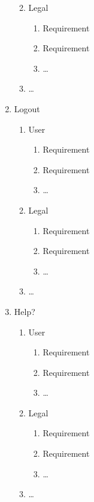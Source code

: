 \documentclass[]{article}
\begin{document}
\begin{enumerate}[{BE}1.]
\begin{enumerate}[{VP1}.1]
\begin{enumerate}
      \end{enumerate}
    \item Legal
      \begin{enumerate}
        \item Requirement
        \item Requirement
        \item \dots
      \end{enumerate}
    \item \dots
  \end{enumerate}
    \item Logout
  \begin{enumerate}[{VP1}.1]
    \item User
      \begin{enumerate}
        \item Requirement
        \item Requirement
        \item \dots
      \end{enumerate}
    \item Legal
      \begin{enumerate}
        \item Requirement
        \item Requirement
        \item \dots
      \end{enumerate}
    \item \dots
  \end{enumerate}
  \item Help?
  \begin{enumerate}[{VP1}.1]
    \item User
      \begin{enumerate}
        \item Requirement
        \item Requirement
        \item \dots
      \end{enumerate}
    \item Legal
      \begin{enumerate}
        \item Requirement
        \item Requirement
        \item \dots
      \end{enumerate}
    \item \dots
  \end{enumerate}
\end{enumerate}
\end{document}
